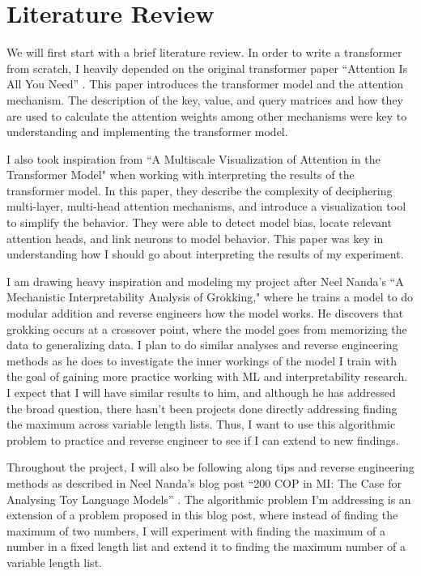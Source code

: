 \documentclass{article}
\begin{document}
\section{Literature Review}

We will first start with a brief literature review. In order to write a transformer from scratch, I heavily depended on the original transformer paper ``Attention Is All You Need'' \cite{6}. This paper introduces the transformer model and the attention mechanism. The description of the key, value, and query matrices and how they are used to calculate the attention weights among other mechanisms were key to understanding and implementing the transformer model.

I also took inspiration from ``A Multiscale Visualization of Attention in the Transformer Model" \cite{7} when working with interpreting the results of the transformer model. In this paper, they describe the complexity of deciphering multi-layer, multi-head attention mechanisms, and introduce a visualization tool to simplify the behavior. They were able to detect model bias, locate relevant attention heads, and link neurons to model behavior. This paper was key in understanding how I should go about interpreting the results of my experiment.

I am drawing heavy inspiration and modeling my project after Neel Nanda's ``A Mechanistic Interpretability Analysis of Grokking,"\cite{2} where he trains a model to do modular addition and reverse engineers how the model works. He discovers that grokking occurs at a crossover point, where the model goes from memorizing the data to generalizing data. I plan to do similar analyses and reverse engineering methods as he does to investigate the inner workings of the model I train with the goal of gaining more practice working with ML and interpretability research. I expect that I will have similar results to him, and although he has addressed the broad question, there hasn't been projects done directly addressing finding the maximum across variable length lists. Thus, I want to use this algorithmic problem to practice and reverse engineer to see if I can extend to new findings.

Throughout the project, I will also be following along tips and reverse engineering methods as described in Neel Nanda's blog post ``200 COP in MI: The Case for Analysing Toy Language Models'' \cite{3}. The algorithmic problem I'm addressing is an extension of a problem proposed in this blog post, where instead of finding the maximum of two numbers, I will experiment with finding the maximum of a number in a fixed length list and extend it to finding the maximum number of a variable length list. 
\end{document}
